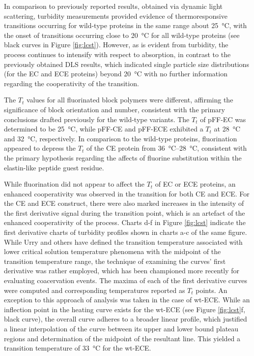 \begin{refsection}
In comparison to previously reported results, obtained via dynamic light
scattering, turbidity measurements provided evidence of thermoresponsive
transitions occurring for wild-type proteins in the same range about
\SI{25}{\celsius}, with the onset of transitions occurring close to
\SI{20}{\celsius} for all wild-type proteins (see black curves in Figure 
\ref{fig:lcst}). However, as is evident from turbidity, the process continues
to intensify with respect to absorption, in contrast to the previously obtained
DLS results, which indicated single particle size distributions (for the EC and
ECE proteins) beyond \SI{20}{\celsius} with no further information regarding the
cooperativity of the transition.

The ${T_t}$ values for all fluorinated block polymers were different, affirming
the significance of block orientation and number, consistent with the primary
conclusions drafted previously for the wild-type
variants.\cite{Haghpanah2010,Haghpanah2009} The ${T_t}$ of pFF-EC was determined
to be \SI{25}{\celsius}, while pFF-CE and pFF-ECE exhibited a ${T_t}$ at
\SI{28}{\celsius} and \SI{32}{\celsius}, respectively. In comparison to the
wild-type proteins, fluorination appeared to depress the ${T_t}$ of the CE
protein from \SIrange{36}{28}{\celsius}, consistent with the primary hypothesis
regarding the affects of fluorine substitution within the elastin-like peptide
guest residue.

While fluorination did not appear to affect the ${T_t}$ of EC or ECE proteins,
an enhanced cooperativity was observed in the transition for both CE and ECE.
For the CE and ECE construct, there were also marked increases in the intensity
of the first derivative signal during the transition point, which is an artefact
of the enhanced cooperativity of the process.  Charts d-f in Figure
\ref{fig:lcst} indicate the first derivative charts of turbidity profiles shown
in charts a-c of the same figure. While Urry and others have defined the
transition temperature associated with lower critical solution temperature
phenomena with the midpoint of the transition temperature
range,\cite{Urry1993,Nuhn2008} the technique of examining the curves' first
derivative was rather employed, which has been championed more recently for
evaluating coacervation
events.\cite{Furgeson2006,Liu2010b,Mackay2010a,Meyer2004} The maxima of each of
the first derivative curves were computed and corresponding temperatures
reported as ${T_t}$ points.  An exception to this approach of analysis was taken
in the case of wt-ECE. While an inflection point in the heating curve exists for
the wt-ECE (see Figure \ref{fig:lcst}f, black curve), the overall curve adheres
to a broader linear profile, which justified a linear interpolation of the curve
between its upper and lower bound plateau regions and determination of the
midpoint of the resultant line. This yielded a transition temperature of
\SI{33}{\celsius} for the wt-ECE.


\end{refsection}
